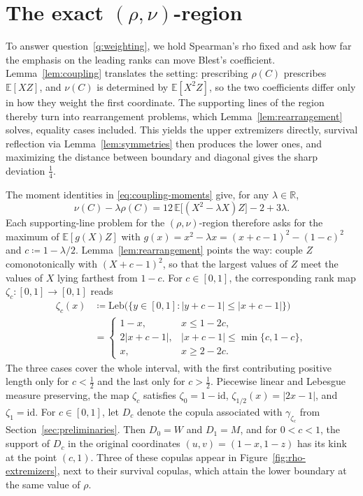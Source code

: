\documentclass[11pt,a4paper]{article}
\theoremstyle{remark}
\newcommand{\E}{\mathbb{E}}
\newcommand{\R}{\mathbb{R}}
\newcommand{\1}{\mathbf{1}}
\begin{document}
\section{\texorpdfstring{The exact $(\rho,\nu)$-region}{The exact (rho,nu)-region}}
\label{sec:rho-nu}

To answer question~\ref{q:weighting}, we hold Spearman's rho fixed and ask how far the emphasis on the leading ranks can move Blest's coefficient.
Lemma~\ref{lem:coupling} translates the setting: prescribing $\rho(C)$ prescribes $\E[XZ]$, and $\nu(C)$ is determined by $\E[X^2Z]$, so the two coefficients differ only in how they weight the first coordinate.
The supporting lines of the region thereby turn into rearrangement problems, which Lemma~\ref{lem:rearrangement} solves, equality cases included.
This yields the upper extremizers directly, survival reflection via Lemma~\ref{lem:symmetries} then produces the lower ones, and maximizing the distance between boundary and diagonal gives the sharp deviation $\frac14$.

The moment identities in \eqref{eq:coupling-moments} give, for any $\lambda\in\R$,
\begin{equation}
  \label{eq:rho-nu-support}
  \nu(C)-\lambda\rho(C)=12\,\E\bigl[(X^2-\lambda X)Z\bigr]-2+3\lambda.
\end{equation}
Each supporting-line problem for the $(\rho,\nu)$-region therefore asks for the maximum of $\E[g(X)Z]$ with $g(x)=x^2-\lambda x=(x+c-1)^2-(1-c)^2$ and $c\coloneqq1-\lambda/2$.
Lemma~\ref{lem:rearrangement} points the way: couple $Z$ comonotonically with $(X+c-1)^2$, so that the largest values of $Z$ meet the values of $X$ lying farthest from $1-c$.
For $c\in[0,1]$, the corresponding rank map $\zeta_c:[0,1]\to[0,1]$ reads
\begin{equation}
  \label{eq:Zc-def}
  \begin{aligned}
  \zeta_c(x)&\coloneqq\mathrm{Leb}\bigl(\{y\in[0,1]:|y+c-1|\le|x+c-1|\}\bigr)\\
  &=
  \begin{cases}
    1-x, & x\le1-2c,\\
    2|x+c-1|, & |x+c-1|\le\min\{c,1-c\},\\
    x, & x\ge2-2c.
  \end{cases}
  \end{aligned}
\end{equation}
The three cases cover the whole interval, with the first contributing positive length only for $c<\frac12$ and the last only for $c>\frac12$.
Piecewise linear and Lebesgue measure preserving, the map $\zeta_c$ satisfies $\zeta_0=1-\mathrm{id}$, $\zeta_{1/2}(x)=|2x-1|$, and $\zeta_1=\mathrm{id}$.
For $c\in[0,1]$, let $D_c$ denote the copula associated with $\gamma_{\zeta_c}$ from Section~\ref{sec:preliminaries}.
Then $D_0=W$ and $D_1=M$, and for $0<c<1$, the support of $D_c$ in the original coordinates $(u,v)=(1-x,1-z)$ has its kink at the point $(c,1)$.
Three of these copulas appear in Figure~\ref{fig:rho-extremizers}, next to their survival copulas, which attain the lower boundary at the same value of $\rho$.
\end{document}

